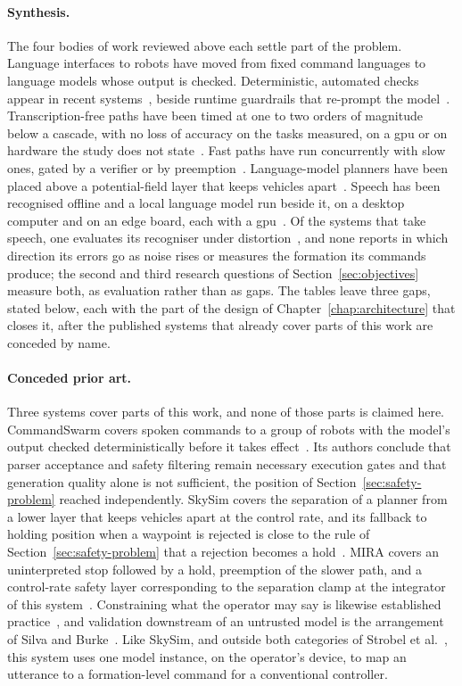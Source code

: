 \paragraph{Synthesis.} The four bodies of work reviewed above each settle part of the problem.
Language interfaces to robots have moved from fixed command languages to language models whose
output is checked. Deterministic, automated checks appear in recent
systems~\cite{torkamani2025,silva2026,skysim2026,commandswarm2026}, beside runtime guardrails that
re-prompt the model~\cite{iannoli2026}. Transcription-free paths have been timed at one to two
orders of magnitude below a cascade, with no loss of accuracy on the tasks measured, on a \gls{gpu}
or on hardware the study does not state~\cite{simoes2024,henry2026}. Fast paths have run
concurrently with slow ones, gated by a verifier or by preemption~\cite{relays2s,mira}.
Language-model planners have been placed above a potential-field layer that keeps vehicles
apart~\cite{skysim2026}. Speech has been recognised offline and a local language model run beside
it, on a desktop computer and on an edge board, each with a
\gls{gpu}~\cite{sikorski2025,torkamani2025}. Of the systems that take speech, one evaluates its
recogniser under distortion~\cite{contreras2020}, and none reports in which direction its errors go
as noise rises or measures the formation its commands produce; the second and third research
questions of Section~\ref{sec:objectives} measure both, as evaluation rather than as gaps. The tables
leave three gaps, stated below, each with the part of the design of Chapter~\ref{chap:architecture}
that closes it, after the published systems that already cover parts of this work are conceded by name.

\paragraph{Conceded prior art.} Three systems cover parts of this work, and none of those parts is
claimed here. CommandSwarm covers spoken commands to a group of robots with the model's output
checked deterministically before it takes effect~\cite{commandswarm2026}. Its authors conclude that
parser acceptance and safety filtering remain necessary execution gates and that generation quality
alone is not sufficient, the position of Section~\ref{sec:safety-problem} reached independently.
SkySim covers the separation of a planner from a lower layer that keeps vehicles apart at the
control rate, and its fallback to holding position when a waypoint is rejected is close to the rule
of Section~\ref{sec:safety-problem} that a rejection becomes a hold~\cite{skysim2026}. MIRA covers
an uninterpreted stop followed by a hold, preemption of the slower path, and a control-rate safety
layer corresponding to the separation clamp at the integrator of this system~\cite{mira}.
Constraining what the operator may say is likewise established
practice~\cite{landau2017,contreras2020}, and validation downstream of an untrusted model is the
arrangement of Silva and Burke~\cite{silva2026}. Like SkySim, and outside both categories of Strobel
et al.~\cite{llm2swarm2024}, this system uses one model instance, on the operator's device, to map
an utterance to a formation-level command for a conventional controller.

